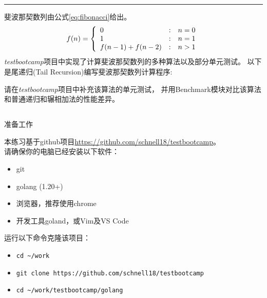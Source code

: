 \documentclass[12pt,addpoints,fleqn]{exam}
\begin{document}
\noindent
\rule[2ex]{\textwidth}{2pt}

\newpage

\begin{questions}
  \pointsinrightmargin
  \setlength{\rightpointsmargin}{2cm}
  \CorrectChoiceEmphasis{\color{red}\itshape}

\newpage
\question[40] 斐波那契数列由公式\ref{eq:fibonacci}给出。
\begin{equation}
    \label{eq:fibonacci}
    f(n)=\left\{
        \begin{array}{l@{\quad:\quad}l}
            0  & n=0 \\
            1  & n=1 \\
            f(n-1) + f(n-2) & n>1
        \end{array}
    \right.
\end{equation}
\emph{testbootcamp}项目中实现了计算斐波那契数列的多种算法以及部分单元测试。
以下是尾递归(Tail Recursion)编写斐波那契数列计算程序:

请在\emph{testbootcamp}项目中补充该算法的单元测试，
并用Benchmark模块对比该算法和普通递归和辗相加法的性能差异。

\begin{parts}
  \part{}准备工作

本练习基于github项目\href{https://github.com/schnell18/testbootcamp}{https://github.com/schnell18/testbootcamp}。\\
请确保你的电脑已经安装以下软件：

\begin{itemize}
    \item git
    \item golang (1.20+)
    \item 浏览器，推荐使用chrome
    \item 开发工具goland，或Vim及VS Code
\end{itemize}

运行以下命令克隆该项目：
\begin{itemize}
    \item \verb=cd ~/work=
    \item \verb=git clone https://github.com/schnell18/testbootcamp=
    \item \verb=cd ~/work/testbootcamp/golang=
\end{itemize}


\end{parts}
\end{questions}
\end{document}
